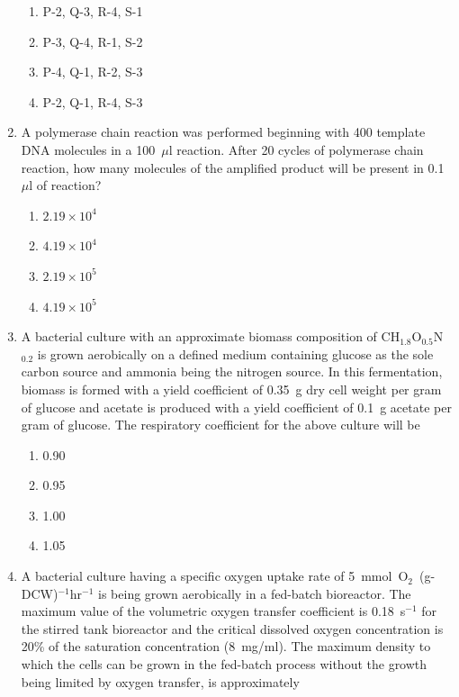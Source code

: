 \documentclass[journal,12pt,onecolumn]{IEEEtran}
\begin{document}
\begin{enumerate}
\begin{multicols}{2}
\begin{enumerate}[label=(\Alph*)]
    \item P-2, Q-3, R-4, S-1
    \item P-3, Q-4, R-1, S-2
    \item P-4, Q-1, R-2, S-3
    \item P-2, Q-1, R-4, S-3
\end{enumerate}
\end{multicols}

\item A polymerase chain reaction was performed beginning with 400 template DNA molecules in a 100~$\mu$l reaction. After 20 cycles of polymerase chain reaction, how many molecules of the amplified product will be present in 0.1~$\mu$l of reaction?

\begin{multicols}{2}
\begin{enumerate}[label=(\Alph*)]
    \item $2.19 \times 10^{4}$
    \item $4.19 \times 10^{4}$
    \item $2.19 \times 10^{5}$
    \item $4.19 \times 10^{5}$
\end{enumerate}
\end{multicols}

\item A bacterial culture with an approximate biomass composition of CH$_{1.8}$O$_{0.5}$N$_{0.2}$ is grown aerobically on a defined medium containing glucose as the sole carbon source and ammonia being the nitrogen source. In this fermentation, biomass is formed with a yield coefficient of 0.35~g dry cell weight per gram of glucose and acetate is produced with a yield coefficient of 0.1~g acetate per gram of glucose. The respiratory coefficient for the above culture will be

\begin{multicols}{2}
\begin{enumerate}[label=(\Alph*)]
    \item 0.90
    \item 0.95
    \item 1.00
    \item 1.05
\end{enumerate}
\end{multicols}

\item A bacterial culture having a specific oxygen uptake rate of 5~mmol~O$_2$~(g-DCW)$^{-1}$hr$^{-1}$ is being grown aerobically in a fed-batch bioreactor. The maximum value of the volumetric oxygen transfer coefficient is 0.18~s$^{-1}$ for the stirred tank bioreactor and the critical dissolved oxygen concentration is 20\% of the saturation concentration (8~mg/ml). The maximum density to which the cells can be grown in the fed-batch process without the growth being limited by oxygen transfer, is approximately


\end{enumerate}
\end{document}
